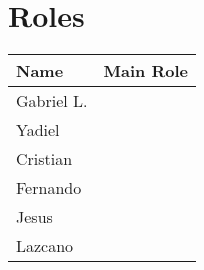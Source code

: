 \documentclass{article}
\begin{document}
\section{Roles}
\begin{center}

\begin{tabular}{| l | p{5cm} |}\hline
Name & Main Role \\ \hline
Gabriel L. & \\ \hline
Yadiel     & \\ \hline
Cristian   & \\ \hline
Fernando   & \\ \hline
Jesus	   & \\ \hline
Lazcano    & \\ \hline
\end{tabular}

\end{center}
\end{document}

